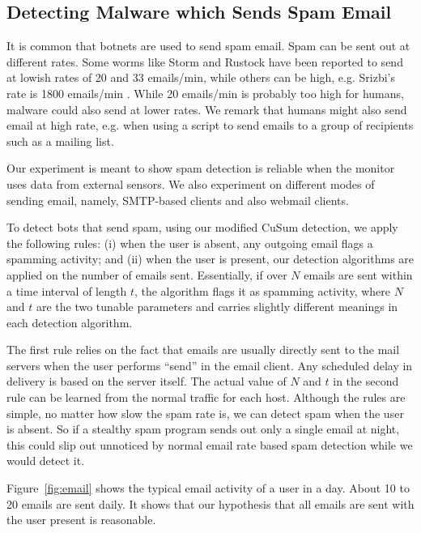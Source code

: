 \subsection{Detecting Malware which Sends Spam Email} \label{sec:sensor-spam}

It is common that botnets are used to send spam email.
Spam can be sent out at different rates.
Some worms like Storm and Rustock have been reported to send at lowish
rates of 20 and 33 emails/min, while others can be high, e.g. Srizbi's rate is
1800 emails/min \cite{john2009studying}. While 20 emails/min is probably too
high for humans, malware could also send at lower rates.
We remark that humans might also send email at high rate, e.g.
when using a script to send emails to a group of recipients such 
as a mailing list.

Our experiment is meant to show
spam detection is reliable when the monitor uses
data from external sensors.
We also experiment on
different modes of sending email, namely,
SMTP-based clients and also webmail clients.


To detect bots that send spam, using our modified CuSum detection, we apply the following rules: (i) when
the user is absent, any outgoing email flags a spamming activity; and
(ii) when the user is present, our detection algorithms are applied on the
number of emails sent. Essentially, if over $N$ emails are sent
within a time interval of length $t$, the algorithm flags it as
spamming activity, where $N$ and $t$ are the two tunable parameters and carries slightly different meanings in each detection algorithm.

The first rule relies on the fact that emails are usually directly
sent to the mail servers when the user performs ``send''
in the email client. Any scheduled
delay in delivery is based on the server itself. The actual value of
$N$ and $t$ in the second rule can be learned from the normal
traffic for each host.
Although the rules are simple, no matter how slow the spam rate
is, we can detect spam when the user is absent. So if a
stealthy spam program sends out only a single email at night,
this could slip out unnoticed by normal email rate based spam detection
while we would detect it.

Figure~\ref{fig:email} shows the typical email activity of a
user in a day. About 10 to 20 emails are sent daily.
It shows that our hypothesis that all emails are sent with the
user present is reasonable.

